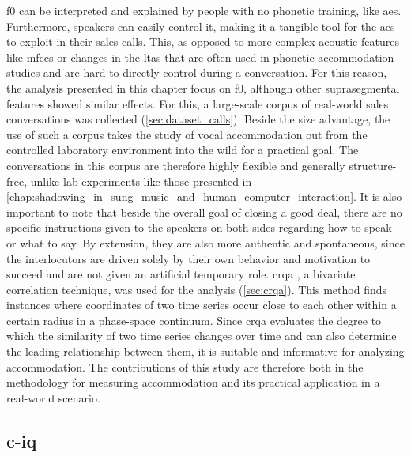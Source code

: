 \Acf{f0} can be interpreted and explained by people with no phonetic training, like \acp{ae}.
Furthermore, speakers can easily control it, making it a tangible tool for the \acp{ae} to exploit in their sales calls.
This, as opposed to more complex acoustic features like \acp{mfcc} or changes in the \ac{ltas} that are often used in phonetic accommodation studies \citep[e.g.,][]{Levitan2011measuring, Borrie2019syncing} and are hard to directly control during a conversation.
For this reason, the analysis presented in this chapter focus on \ac{f0}, although other suprasegmental features showed similar effects.
For this, a large-scale corpus of real-world sales conversations was collected (\cref{sec:dataset_calls}).
Beside the size advantage, the use of such a corpus takes the study of vocal accommodation out from the controlled laboratory environment into the wild for a practical goal.
The conversations in this corpus are therefore highly flexible and generally structure-free, unlike lab experiments like those presented in \cref{chap:shadowing_in_sung_music_and_human_computer_interaction}.
It is also important to note that beside the overall goal of closing a good deal, there are no specific instructions given to the speakers on both sides regarding how to speak or what to say.
By extension, they are also more authentic and spontaneous, since the interlocutors are driven solely by their own behavior and motivation to succeed and are not given an artificial temporary role.
\Ac{crqa} \citep{Zbilut1998detecting}, a bivariate correlation technique, was used for the analysis (\cref{sec:crqa}).
This method finds instances where coordinates of two time series occur close to each other within a certain radius in a phase-space continuum.
Since \ac{crqa} evaluates the degree to which the similarity of two time series changes over time and can also determine the leading relationship between them, it is suitable and informative for analyzing accommodation.
The contributions of this study are therefore both in the methodology for measuring accommodation and its practical application in a real-world scenario.

\subsection{\Acl{c-iq}}
\label{subsec:conversation_intelligence}

